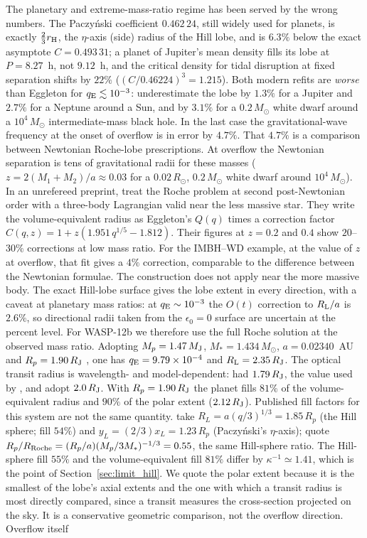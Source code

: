 \documentclass[twocolumn]{aastex702}
\newcommand{\qE}{q_{\rm E}}
\newcommand{\RL}{R_{\rm L}}
\begin{document}
The planetary and extreme-mass-ratio regime has been served by the wrong numbers. The Paczy\'nski coefficient $0.462\,24$, still widely used for planets, is exactly $\tfrac23 r_{\rm H}$, the $\eta$-axis (side) radius of the Hill lobe, and is $6.3\%$ below the exact asymptote $C=0.493\,31$; a planet of Jupiter's mean density fills its lobe at $P=8.27$~h, not $9.12$~h, and the critical density for tidal disruption at fixed separation shifts by $22\%$ ($(C/0.46224)^3=1.215$). Both modern refits are {\em worse} than Eggleton for $\qE\lesssim10^{-3}$: \citet{Qi2026} underestimate the lobe by $1.3\%$ for a Jupiter and $2.7\%$ for a Neptune around a Sun, and by $3.1\%$ for a $0.2\,M_\odot$ white dwarf around a $10^4\,M_\odot$ intermediate-mass black hole. In the last case the gravitational-wave frequency at the onset of overflow is in error by $4.7\%$. That $4.7\%$ is a comparison between Newtonian Roche-lobe prescriptions. At overflow the Newtonian separation is tens of gravitational radii for these masses ($z=2(M_1+M_2)/a\approx0.03$ for a $0.02\,R_\odot$, $0.2\,M_\odot$ white dwarf around $10^4\,M_\odot$). In an unrefereed preprint, \citet{Ratkovic2005} treat the Roche problem at second post-Newtonian order with a three-body Lagrangian valid near the less massive star. They write the volume-equivalent radius as Eggleton's $Q(q)$ times a correction factor $C(q,z)=1+z(1.951\,q^{1/5}-1.812)$. Their figures at $z=0.2$ and $0.4$ show $20$--$30\%$ corrections at low mass ratio. For the IMBH--WD example, at the value of $z$ at overflow, that fit gives a $4\%$ correction, comparable to the difference between the Newtonian formulae. The construction does not apply near the more massive body. The exact Hill-lobe surface gives the lobe extent in every direction, with a caveat at planetary mass ratios: at $\qE\sim10^{-3}$ the $O(t)$ correction to $\RL/a$ is $2.6\%$, so directional radii taken from the $\epsilon_0=0$ surface are uncertain at the percent level. For WASP-12b we therefore use the full Roche solution at the observed mass ratio. Adopting $M_p=1.47\,M_{\rm J}$, $M_\ast=1.434\,M_\odot$, $a=0.02340$~AU and $R_p=1.90\,R_{\rm J}$ \citep{Collins2017}, one has $\qE=9.79\times10^{-4}$ and $\RL=2.35\,R_{\rm J}$. The optical transit radius is wavelength- and model-dependent: \citet{Hebb2009} had $1.79\,R_{\rm J}$, the value used by \citet{Lai2010}, and \citet{Vissapragada2026} adopt $2.0\,R_{\rm J}$. With $R_p=1.90\,R_{\rm J}$ the planet fills $81\%$ of the volume-equivalent radius and $90\%$ of the polar extent ($2.12\,R_{\rm J}$). Published fill factors for this system are not the same quantity. \citet{Lai2010} take $R_L=a(q/3)^{1/3}=1.85\,R_p$ (the Hill sphere; fill $54\%$) and $y_L=(2/3)x_L=1.23\,R_p$ (Paczy\'nski's $\eta$-axis); \citet{Vissapragada2026} quote $R_p/R_{\rm Roche}=(R_p/a)(M_p/3M_\ast)^{-1/3}=0.55$, the same Hill-sphere ratio. The Hill-sphere fill $55\%$ and the volume-equivalent fill $81\%$ differ by $\kappa^{-1}\simeq1.41$, which is the point of Section~\ref{sec:limit_hill}. We quote the polar extent because it is the smallest of the lobe's axial extents and the one with which a transit radius is most directly compared, since a transit measures the cross-section projected on the sky. It is a conservative geometric comparison, not the overflow direction. Overflow itself 
\end{document}
